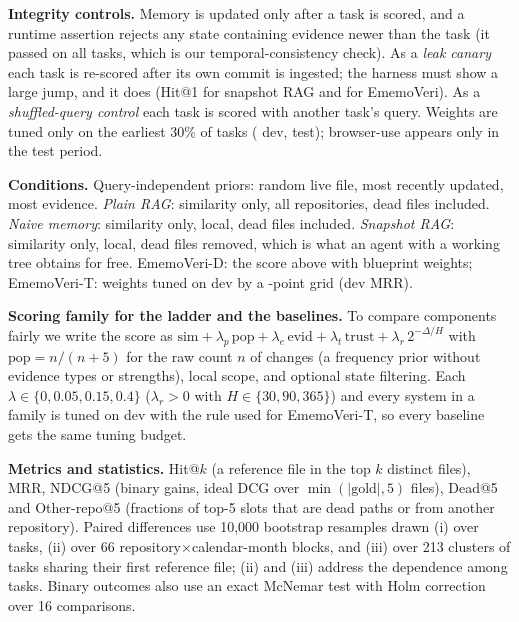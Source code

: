 \documentclass[runningheads]{llncs}
\newcommand{\sys}{EmemoVeri}
\begin{document}
\begin{table}[t]\centering\small
\resizebox{\linewidth}{!}{}
\caption{Mined repositories and task selection. ``Eligible'' tasks are non-bot, non-revert, modify one to four source files that already have a claim, and occur after a warm-up of 35\% of the repository's source-touching commits; up to 400 evenly spaced tasks per repository are selected. Clock anomalies are commits whose recorded timestamp precedes the running clock.}
\label{tab:data}
\end{table}

\textbf{Integrity controls.} Memory is updated only after a task is scored, and a runtime assertion rejects any state containing evidence newer than the task (it passed on all \nTasks{} tasks, which is our temporal-consistency check). As a \emph{leak canary} each task is re-scored after its own commit is ingested; the harness must show a large jump, and it does (Hit@1 \leakSnapOne{} for snapshot RAG and \leakEmvOne{} for \sys{}). As a \emph{shuffled-query control} each task is scored with another task's query. Weights are tuned only on the earliest 30\% of tasks (\nDev{} dev, \nTest{} test); browser-use appears only in the test period.

\textbf{Conditions.} Query-independent priors: random live file, most recently updated, most evidence. \emph{Plain RAG}: similarity only, all repositories, dead files included. \emph{Naive memory}: similarity only, local, dead files included. \emph{Snapshot RAG}: similarity only, local, dead files removed, which is what an agent with a working tree obtains for free. \sys{}-D: the score above with blueprint weights; \sys{}-T: weights tuned on dev by a \gridSize{}-point grid (dev MRR).

\textbf{Scoring family for the ladder and the baselines.} To compare components fairly we write the score as $\mathrm{sim}+\lambda_p\,\mathrm{pop}+\lambda_e\,\mathrm{evid}+\lambda_t\,\mathrm{trust}+\lambda_r\,2^{-\Delta/H}$ with $\mathrm{pop}=n/(n+5)$ for the raw count $n$ of changes (a frequency prior without evidence types or strengths), local scope, and optional state filtering. Each $\lambda\in\{0,0.05,0.15,0.4\}$ ($\lambda_r>0$ with $H\in\{30,90,365\}$) and every system in a family is tuned on dev with the rule used for \sys{}-T, so every baseline gets the same tuning budget.

\textbf{Metrics and statistics.} Hit@$k$ (a reference file in the top $k$ distinct files), MRR, NDCG@5 (binary gains, ideal DCG over $\min(|\mathrm{gold}|,5)$ files), Dead@5 and Other-repo@5 (fractions of top-5 slots that are dead paths or from another repository). Paired differences use 10{,}000 bootstrap resamples drawn (i) over tasks, (ii) over 66 repository$\times$calendar-month blocks, and (iii) over 213 clusters of tasks sharing their first reference file; (ii) and (iii) address the dependence among tasks. Binary outcomes also use an exact McNemar test with Holm correction over 16 comparisons.
\end{document}
